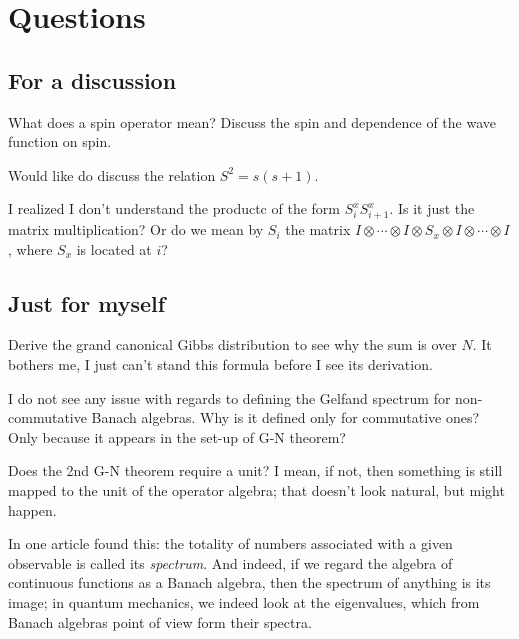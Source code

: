 \section{Questions}
\subsection{For a discussion}

\begin{quest}
What does a spin operator mean? Discuss the spin and dependence of the wave function on spin.
\end{quest}

\begin{quest}
Would like do discuss the relation $S^2 = s(s+1)$.
\end{quest}

\begin{quest}
I realized I don't understand the productc of the form $S_i^x S_{i+1}^x$. Is it just the matrix multiplication? Or do we mean by $S_i$ the matrix $I \otimes \cdots \otimes I \otimes S_x \otimes I \otimes \cdots \otimes I$, where $S_x$ is located at $i$?
\end{quest}

\subsection{Just for myself}
\begin{quest}
Derive the grand canonical Gibbs distribution to see why the sum is over $N$. It bothers me, I just can't stand this formula before I see its derivation.
\end{quest}
\begin{quest}
I do not see any issue with regards to defining the Gelfand spectrum for non-commutative Banach algebras. Why is it defined only for commutative ones? Only because it appears in the set-up of G-N theorem?
\end{quest}
\begin{quest}
Does the 2nd G-N theorem require a unit? I mean, if not, then something is still mapped to the unit of the operator algebra; that doesn't look natural, but might happen.
\end{quest}

In one article found this: the totality of numbers associated with a given observable is called its \emph{spectrum}. And indeed, if we regard the algebra of continuous functions as a Banach algebra, then the spectrum of anything is its image; in quantum mechanics, we indeed look at the eigenvalues, which from Banach algebras point of view form their spectra.

